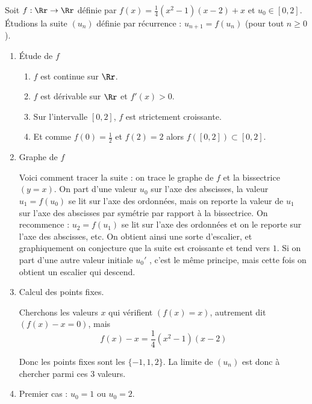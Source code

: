 \documentclass[class=report,crop=false]{standalone}
\begin{document}
\begin{exemple}
Soit $f : \Rr \to \Rr$ définie par $f(x)=\frac14(x^2-1)(x-2)+x$ et $u_0 \in [0,2]$.
\'Etudions la suite $(u_n)$ définie par récurrence : $u_{n+1}=f(u_n)$ (pour tout $n\ge0$).

\begin{enumerate}

  \item \'Etude de $f$
  \begin{enumerate}
    \item $f$ est continue sur $\Rr$.
    \item $f$ est dérivable sur $\Rr$ et $f'(x)>0$.
    \item Sur l'intervalle $[0,2]$, $f$ est strictement croissante.
    \item Et comme $f(0)=\frac12$ et $f(2)=2$ alors $f([0,2]) \subset [0,2]$.
  \end{enumerate}

  \item Graphe de $f$



Voici comment tracer la suite : on trace le graphe de $f$ et la bissectrice $(y=x)$.
On part d'une valeur $u_0$  sur l'axe des abscisses, la valeur $u_1=f(u_0)$ se lit
sur l'axe des ordonnées, mais on reporte la valeur de $u_1$ sur l'axe des
abscisses par symétrie par rapport à la bissectrice.
On recommence : $u_2=f(u_1)$ se lit sur l'axe des ordonnées et on le reporte sur l'axe des abscisses, etc.
On obtient ainsi une sorte d'escalier, et graphiquement on conjecture que la suite est croissante et tend vers $1$.
Si on part d'une autre valeur initiale $u_0'$ , c'est le même principe, mais cette fois on obtient
un escalier qui descend.





  \item Calcul des points fixes.

Cherchons les valeurs $x$ qui vérifient $(f(x)=x)$, autrement dit $(f(x)-x=0)$, mais
\begin{equation}
\label{eq:fxmoinsx}
f(x)-x=\frac14 (x^2-1)(x-2)
\end{equation}

Donc les points fixes sont les $\{-1,1,2\}$.
La limite de $(u_n)$ est donc à chercher parmi ces $3$ valeurs.


  \item Premier cas : $u_0=1$ ou $u_0=2$.


\end{enumerate}
\end{exemple}
\end{document}
